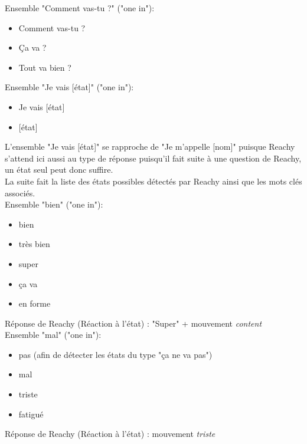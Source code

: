 Ensemble "Comment vas-tu ?" {\color{red}("one in")}:
\begin{itemize}
    \item Comment vas-tu ?
    \item Ça va ? 
    \item Tout va bien ? \\
\end{itemize}

Ensemble "Je vais [état]" {\color{red}("one in")}:
\begin{itemize}
    \item Je vais [état]
    \item{[état] \\}
\end{itemize}

L'ensemble "Je vais [état]" se rapproche de "Je m'appelle [nom]" puisque Reachy s'attend ici aussi au type de réponse puisqu'il fait suite à une question de Reachy, un état seul peut donc suffire. \\

La suite fait la liste des états possibles détectés par Reachy ainsi que les mots clés associés. \\

Ensemble "bien" {\color{red}("one in")}:
\begin{itemize}
    \item bien
    \item très bien
    \item super
    \item ça va
    \item en forme \\
\end{itemize}

Réponse de Reachy (Réaction à l'état) : "Super" + mouvement \textit{content}\\

Ensemble "mal" {\color{red}("one in")}:
\begin{itemize}
    \item pas (afin de détecter les états du type "ça ne va pas")
    \item mal
    \item triste 
    \item fatigué \\
\end{itemize}

Réponse de Reachy (Réaction à l'état) : mouvement \textit{triste}
